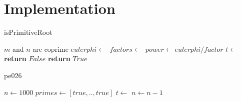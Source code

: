 \documentclass{article}
\begin{document}
\section{Implementation}

\begin{algorithm}
    \caption{isPrimitiveRoot}\label{alg:isPrimitiveRoot}
    \begin{algorithmic}[1]
        \State {}
        \Require $m$ and $n$ are coprime
        \State $eulerphi \gets$ 
        \State $factors \gets$ 
            \State $power \gets eulerphi / factor$ 
            \State $t \gets$ 
                \State \textbf{return} $False$
            \EndIf
        \EndFor
        \State \textbf{return} $True$
        \EndProcedure
    \end{algorithmic}
\end{algorithm}

\begin{algorithm}
    \caption{pe026} \label{alg:pe026}
    \begin{algorithmic}[1]
        \State $n \gets 1000$
        \State $primes \gets [true, .., true]$ 
        \State {} 
        \Repeat {}
            \State $t \gets$ 
            \State $n \gets n - 1$
            \State {}
    \end{algorithmic}
\end{algorithm}
\end{document}
